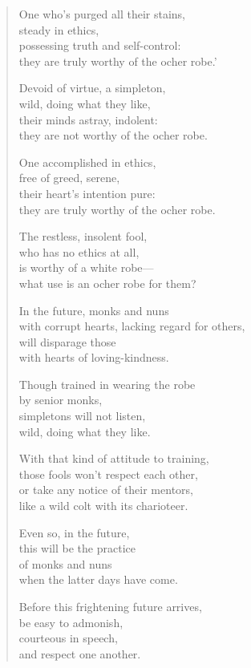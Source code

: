 \documentclass[12pt,openany]{book}%
\begin{document}
\begin{verse}
One who’s purged all their stains, \\
steady in ethics, \\
possessing truth and self-control: \\
they are truly worthy of the ocher robe.’ 

Devoid of virtue, a simpleton, \\
wild, doing what they like, \\
their minds astray, indolent: \\
they are not worthy of the ocher robe. 

One accomplished in ethics, \\
free of greed, serene, \\
their heart’s intention pure: \\
they are truly worthy of the ocher robe. 

The restless, insolent fool, \\
who has no ethics at all, \\
is worthy of a white robe—\\
what use is an ocher robe for them? 

In the future, monks and nuns \\
with corrupt hearts, lacking regard for others, \\
will disparage those \\
with hearts of loving-kindness. 

Though trained in wearing the robe \\
by senior monks, \\
simpletons will not listen, \\
wild, doing what they like. 

With that kind of attitude to training, \\
those fools won’t respect each other, \\
or take any notice of their mentors, \\
like a wild colt with its charioteer. 

Even so, in the future, \\
this will be the practice \\
of monks and nuns \\
when the latter days have come. 

Before this frightening future arrives, \\
be easy to admonish, \\
courteous in speech, \\
and respect one another. 


\end{verse}
\end{document}
